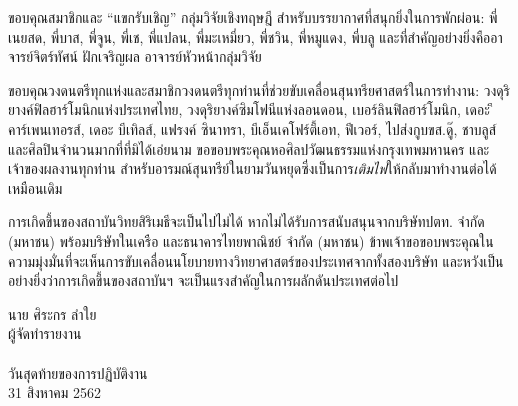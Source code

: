 \documentclass[16pt,a4]{internshipreport}
\begin{document}
ขอบคุณสมาชิกและ ``แขกรับเชิญ'' กลุ่มวิจัยเชิงทฤษฎี สำหรับบรรยากาศที่สนุกยิ่งในการพักผ่อน: พี่เนยสด, พี่บาส, พี่จูน, พี่เช, พี่แปลน, พี่มะเหมี่ยว, พี่ชวิน, พี่หมูแดง, พี่บลู
และที่สำคัญอย่างยิ่งคืออาจารย์จิตร์ทัศน์ ฝักเจริญผล อาจารย์หัวหน้ากลุ่มวิจัย

ขอบคุณวงดนตรีทุกแห่งและสมาชิกวงดนตรีทุกท่านที่ช่วยขับเคลื่อนสุนทรียศาสตร์ในการทำงาน: วงดุริยางค์ฟิลฮาร์โมนิกแห่งประเทศไทย, วงดุริยางค์ซิมโฟนีแห่งลอนดอน, เบอร์ลินฟิลฮาร์โมนิก, เดอะ ึคาร์เพนเทอรส์, เดอะ บีเทิลส์, แฟรงค์ ซินาทรา, บีเอ็นเคโฟร์ตี้เอท, ฟีเวอร์, ไปส่งกูบขส.ดู๊, ชาบลูส์ และศิลปินจำนวนมากที่ที่มิได้เอ่ยนาม ขอขอบพระคุณหอศิลปวัฒนธรรมแห่งกรุงเทพมหานคร และเจ้าของผลงานทุกท่าน สำหรับอารมณ์สุนทรีย์ในยามวันหยุดซึ่งเป็นการ\textit{เติมไฟ}ให้กลับมาทำงานต่อได้เหมือนเดิม

การเกิดขึ้นของสถาบันวิทยสิริเมธีจะเป็นไปไม่ได้ หากไม่ได้รับการสนับสนุนจากบริษัทปตท. จำกัด (มหาชน) พร้อมบริษัทในเครือ และธนาคารไทยพาณิชย์ จำกัด (มหาชน)  ข้าพเจ้าขอขอบพระคุณในความมุ่งมั่นที่จะเห็นการขับเคลื่อนนโยบายทางวิทยาศาสตร์ของประเทศจากทั้งสองบริษัท และหวังเป็นอย่างยิ่งว่าการเกิดขี้นของสถาบันฯ จะเป็นแรงสำคัญในการผลักดันประเทศต่อไป

\vskip 20pt

\hfill\begin{minipage}
    {\dimexpr 5cm}
    \begin{center}
        นาย ศิระกร ลำใย\\
        ผู้จัดทำรายงาน\\~\\

        วันสุดท้ายของการปฏิบัติงาน\\
        31 สิงหาคม 2562
    \end{center}
    \xdef\tpd{\the\prevdepth}
\end{minipage}
\end{document}
